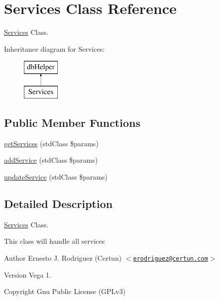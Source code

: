 \hypertarget{class_services}{\section{\-Services \-Class \-Reference}
\label{class_services}
}


\hyperlink{class_services}{\-Services} \-Class.  


\-Inheritance diagram for \-Services\-:\begin{figure}[H]
\begin{center}
\leavevmode
\includegraphics[height=2.000000cm]{class_services}
\end{center}
\end{figure}
\subsection*{\-Public \-Member \-Functions}
\begin{DoxyCompactItemize}
\item 
\hyperlink{class_services_a59098595b4d24b93c1d23c8412f3cc0f}{get\-Services} (std\-Class \$params)
\item 
\hyperlink{class_services_a6c8ef45eef944955b3b2630edd23341e}{add\-Service} (std\-Class \$params)
\item 
\hyperlink{class_services_a43980f7db5663e1d878e6a4aae55fee6}{update\-Service} (std\-Class \$params)
\end{DoxyCompactItemize}


\subsection{\-Detailed \-Description}
\hyperlink{class_services}{\-Services} \-Class. 

\-This class will handle all services

\begin{DoxyAuthor}{\-Author}
\-Ernesto \-J. \-Rodriguez (\-Certun) $<$\href{mailto:erodriguez@certun.com}{\tt erodriguez@certun.\-com}$>$ 
\end{DoxyAuthor}
\begin{DoxyVersion}{\-Version}
\-Vega 1. 
\end{DoxyVersion}
\begin{DoxyCopyright}{\-Copyright}
\-Gnu \-Public \-License (\-G\-P\-Lv3) 
\end{DoxyCopyright}


